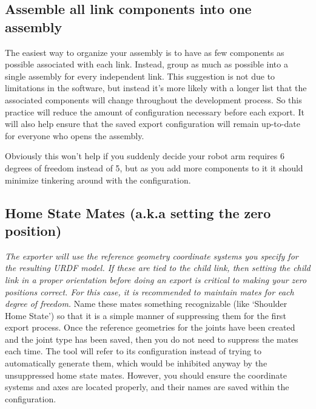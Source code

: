 \subsection{Assemble all link components into one assembly}
The easiest way to organize your assembly is to have as few components as possible associated with each link. Instead, group as much as possible into a single assembly for every independent link. This suggestion is not due to limitations in the software, but instead it's more likely with a longer list that the associated components will change throughout the development process. So this practice will reduce the amount of configuration necessary before each export. It will also help ensure that the saved export configuration will remain up-to-date for everyone who opens the assembly. 

Obviously this won't help if you suddenly decide your robot arm requires 6 degrees of freedom instead of 5, but as you add more components to it it should minimize tinkering around with the configuration.

\subsection{Home State Mates (a.k.a setting the zero position)}\label{sec:ExportHomeState}
\emph{The exporter will use the reference geometry coordinate systems you specify for the resulting URDF model.  If these are tied to the child link, then setting the child link in a proper orientation before doing an export is critical to making your zero positions correct.  For this case, it is recommended to maintain mates for each degree of freedom.} Name these mates something recognizable (like `Shoulder Home State') so that it is a simple manner of suppressing them for the first export process. Once the reference geometries for the joints have been created and the joint type has been saved, then you do not need to suppress the mates each time. The tool will refer to its configuration instead of trying to automatically generate them, which would be inhibited anyway by the unsuppressed home state mates. However, you should ensure the coordinate systems and axes are located properly, and their names are saved within the configuration. 

